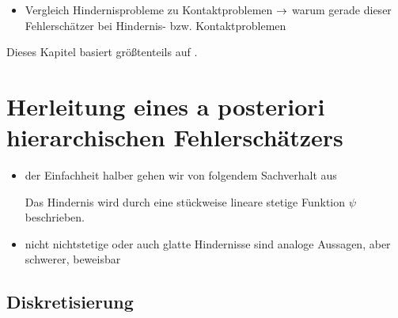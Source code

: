 \label{kap:4}

\begin{itemize}
\item Vergleich Hindernisprobleme zu Kontaktproblemen $\rightarrow$ warum gerade dieser Fehlerschätzer bei Hindernis- bzw. Kontaktproblemen
\end{itemize}

Dieses Kapitel basiert größtenteils auf \cite{ZouVee}.


\section{Herleitung eines a posteriori hierarchischen Fehlerschätzers}
\label{kap:4.1}

\begin{itemize}
\item der Einfachheit halber gehen wir von folgendem Sachverhalt aus
\begin{vor}\label{vor:4.1}
Das Hindernis  wird durch eine stückweise lineare stetige Funktion $\psi$ beschrieben.
\end{vor}

\item nicht nichtstetige oder auch glatte Hindernisse sind analoge Aussagen, aber schwerer, beweisbar
\end{itemize}






\subsection{Diskretisierung}
\label{kap:4.1.1}

